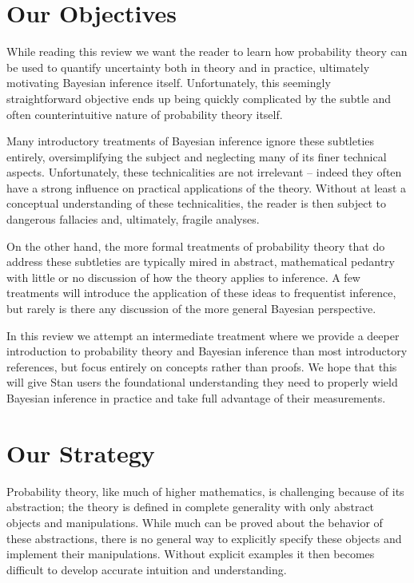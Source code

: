 \section{Our Objectives}

While reading this review we want the reader to learn how probability
theory can be used to quantify uncertainty both in theory and in practice,
ultimately motivating Bayesian inference itself.  Unfortunately, this seemingly
straightforward objective ends up being quickly complicated by the subtle
and often counterintuitive nature of probability theory itself.

Many introductory treatments of Bayesian inference ignore these subtleties
entirely, oversimplifying the subject and neglecting many of its finer technical
aspects.  Unfortunately, these technicalities are not irrelevant -- indeed they
often have a strong influence on practical applications of  the theory.  Without
at least a conceptual understanding of these technicalities, the reader is then
subject to dangerous fallacies and, ultimately, fragile analyses.

On the other hand, the more formal treatments of probability theory that do
address these subtleties are typically mired in abstract, mathematical pedantry
with little or no discussion of how the theory applies to inference.  A few
treatments will introduce the application of these ideas to frequentist inference,
but rarely is there any discussion of the more general Bayesian perspective.

In this review we attempt an intermediate treatment where we provide a deeper
introduction to probability theory and Bayesian inference than most introductory
references, but focus entirely on concepts rather than proofs.  We hope that
this will give Stan users the foundational understanding they need to properly
wield Bayesian inference in practice and take full advantage of their measurements.

\section{Our Strategy}

Probability theory, like much of higher mathematics, is challenging because
of its abstraction; the theory is defined in complete generality with only abstract
objects and manipulations.  While much can be proved about the behavior
of these abstractions, there is no general way to explicitly specify these objects
and implement their manipulations.  Without explicit examples it then becomes
difficult to develop accurate intuition and understanding.

